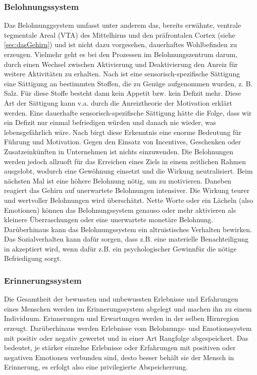 \subsubsection{Belohnungssystem}
\label{sec:Belohnungssystem}
Das Belohnunggsystem umfasst unter anderem das, bereits erwähnte, ventrale tegmentale Areal (VTA) des Mittelhirns und den präfrontalen Cortex (siehe \ref{sec:dasGehirn}) und ist nicht dazu vorgesehen, dauerhaftes Wohlbefinden zu erzeugen. Vielmehr geht es bei den Prozessen im Belohnungszentrum darum, durch einen Wechsel zwischen Aktivierung und Deaktivierung den Anreiz für weitere Aktivitäten zu erhalten. \citep[S. 17]{Seelbach.2011}
\newline Nach \citet[S. 250]{Kirschbaum.2008} ist eine sensorisch-spezifische Sättigung eine Sättigung an bestimmten Stoffen, die zu Genüge aufgenommen wurden, z. B. Salz. Für diese Stoffe besteht dann kein Appetit bzw. kein Defizit mehr. Diese Art der Sättigung kann v.a. durch die Anreiztheorie der Motivation erklärt werden. Eine dauerhafte sensorisch-spezifische Sättigung hätte die Folge, dass wir ein Defizit nur einmal befriedigen würden und danach nie wieder, was lebensgefährlich wäre. \citep[S. 17]{Seelbach.2011} 
\newline Nach \citet[S. 17]{Seelbach.2011} birgt diese Erkenntnis eine enorme Bedeutung für Führung und Motivation. Gegen den Einsatz von Incentives, Geschenken oder Zusatzeinkünften in Unternehmen ist nichts einzuwenden. Die Belohnungen werden jedoch allzuoft für das Erreichen eines Ziels in einem zeitlichen Rahmen ausgelobt, wodurch eine Gewöhnung einsetzt und die Wirkung neutralisiert. Beim nächsten Mal ist eine höhere Belohnung nötig, um zu motivieren. Daneben reagiert das Gehirn auf unerwartete Belohnungen intensiver. Die Wirkung teurer und wertvoller Belohnungen wird überschätzt. Nette Worte oder ein Lächeln (also Emotionen) können das Belohnungssystem genauso oder mehr aktivieren als kleinere Überraschungen oder eine unerwartete monetäre Belohnung. Darüberhinaus kann das Belohnungssystem ein altruistisches Verhalten bewirken. Das Sozialverhalten kann dafür sorgen, dass z.B. eine materielle Benachteiligung in akzeptiert wird, wenn dafür z.B. ein \glqq psychologischer Gewinn\grqq für die nötige Befriedigung sorgt. \cite[S. 17]{Seelbach.2011}

\subsubsection{Erinnerungssystem}
\label{sec:Erinnerungssystem}
Die Gesamtheit der bewussten und unbewussten Erlebnisse und Erfahrungen eines Menschen werden im Erinnerungssystem abgelegt und machen ihn zu einem Individuum. Erinnerungen und Erwartungen werden in der selben Hirnregion erzeugt. Darüberhinaus werden Erlebnisse vom Belohnungs- und Emotionssystem mit positiv oder negativ gewertet und in einer Art Rangfolge abgespeichert. 
Das bedeutet, je stärker einzelne Erlebnisse oder Erfahrungen mit positiven oder negativen Emotionen verbunden sind, desto besser behält sie der Mensch in Erinnerung, es erfolgt also eine \glqq privilegierte Abspeicherrung\grqq. \citep[S. 18]{Seelbach.2011}

